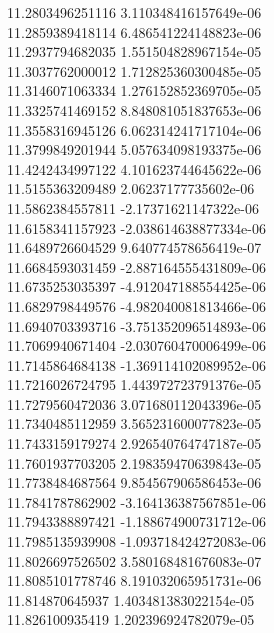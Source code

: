 {11.2803496251116 3.110348416157649e-06
 \\
11.2859389418114 6.486541224148823e-06
 \\
11.2937794682035 1.551504828967154e-05
 \\
11.3037762000012 1.712825360300485e-05
 \\
11.3146071063334 1.276152852369705e-05
 \\
11.3325741469152 8.848081051837653e-06
 \\
11.3558316945126 6.062314241717104e-06
 \\
11.3799849201944 5.057634098193375e-06
 \\
11.4242434997122 4.101623744645622e-06
 \\
11.5155363209489 2.06237177735602e-06
 \\
11.5862384557811 -2.17371621147322e-06
 \\
11.6158341157923 -2.038614638877334e-06
 \\
11.6489726604529 9.640774578656419e-07
 \\
11.6684593031459 -2.887164555431809e-06
 \\
11.6735253035397 -4.912047188554425e-06
 \\
11.6829798449576 -4.982040081813466e-06
 \\
11.6940703393716 -3.751352096514893e-06
 \\
11.7069940671404 -2.030760470006499e-06
 \\
11.7145864684138 -1.369114102089952e-06
 \\
11.7216026724795 1.443972723791376e-05
 \\
11.7279560472036 3.071680112043396e-05
 \\
11.7340485112959 3.565231600077823e-05
 \\
11.7433159179274 2.926540764747187e-05
 \\
11.7601937703205 2.198359470639843e-05
 \\
11.7738484687564 9.854567906586453e-06
 \\
11.7841787862902 -3.164136387567851e-06
 \\
11.7943388897421 -1.188674900731712e-06
 \\
11.7985135939908 -1.093718424272083e-06
 \\
11.8026697526502 3.580168481676083e-07
 \\
11.8085101778746 8.191032065951731e-06
 \\
11.814870645937 1.403481383022154e-05
 \\
11.826100935419 1.202396924782079e-05
}
